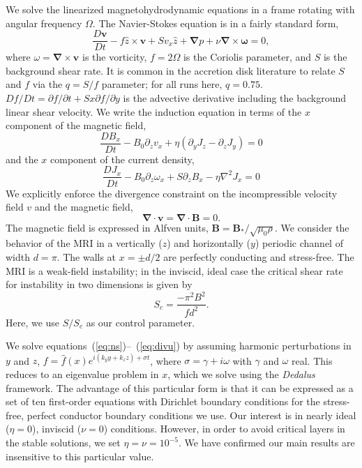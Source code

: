 \documentclass[aps,prl,reprint,superscriptaddress]{revtex4-1}
\newcommand{\SSC}{S/S_{c}}
\begin{document}
We solve the linearized magnetohydrodynamic equations in a frame rotating with angular frequency $\Omega$. The Navier-Stokes equation is in a fairly standard form,
\begin{equation}
  \label{eq:ns}
  \frac{D \mathbf{v}}{Dt} - f \hat{z} \times \mathbf{v} + S v_x \hat{z} + \mathbf{\nabla}{p} + \nu \mathbf{\nabla} \times \mathbf{\omega} = 0,
\end{equation}
where $\omega = \mathbf{\nabla} \times \mathbf{v}$ is the vorticity, $f = 2 \Omega$ is the Coriolis parameter, and $S$ is the background shear rate.
It is common in the accretion disk literature to relate $S$ and $f$ via the $q = S/f$ parameter; for all runs here, $q = 0.75$.
$Df/Dt = \partial f/\partial t + S x \partial f/\partial y$ is the advective derivative including the background linear shear velocity.  We write the induction equation in terms of the $x$ component of the magnetic field,
\begin{equation}
  \label{eq:Bx}
  \frac{D B_x}{Dt} - B_0 \partial_z v_x + \eta (\partial_y J_z - \partial_z J_y) = 0
\end{equation}
and the $x$ component of the current density,
\begin{equation}
  \label{eq:Jx}
  \frac{D J_x}{Dt} - B_0 \partial_z \omega_x + S \partial_z B_x - \eta \nabla^2 J_x = 0
\end{equation}
We explicitly enforce the divergence constraint on the incompressible velocity field $v$ and the magnetic field,
\begin{equation}
  \label{eq:divu}
  \mathbf{\nabla} \cdot \mathbf{v} = \mathbf{\nabla} \cdot \mathbf{B} = 0.
\end{equation}
The magnetic field is expressed in Alfven units, $\mathbf{B} = \mathbf{B_*}/\sqrt{\mu_0 \rho}$.
We consider the behavior of the MRI in a vertically ($z$) and horizontally ($y$) periodic channel of width $d = \pi$. The walls at $x = \pm d/2$ are perfectly conducting and stress-free. The MRI is a weak-field instability; in the inviscid, ideal case the critical shear rate for instability in two dimensions is given by
\begin{equation}
  \label{eq:Sc}
  S_c = \frac{-\pi^2 B^2}{f d^2}.
\end{equation}
Here, we use $\SSC$ as our control parameter. 

We solve equations~(\ref{eq:ns})--~(\ref{eq:divu}) by assuming harmonic perturbations in $y$ and $z$, $f = \hat{f}(x) e^{i(k_y y + k_z z) + \sigma t}$, where $\sigma = \gamma + i\omega$ with $\gamma$ and $\omega$ real. This reduces to an eigenvalue problem in $x$, which we solve using the \emph{Dedalus} framework. The advantage of this particular form is that it can be expressed as a set of ten first-order equations with Dirichlet boundary conditions for the stress-free, perfect conductor boundary conditions we use. 
Our interest is in nearly ideal ($\eta = 0$), inviscid ($\nu = 0$) conditions.
However, in order to avoid critical layers in the stable solutions, we set $\eta=\nu=10^{-5}$.
We have confirmed our main results are insensitive to this particular value. 
\end{document}

